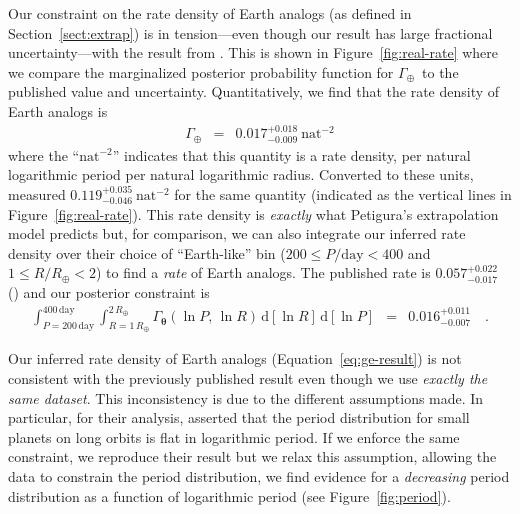 \documentclass[12pt,preprint]{aastex}
\newcommand{\figref}[1]{\ref{fig:#1}}
\newcommand{\Fig}[1]{Figure~\figref{#1}}
\newcommand{\fig}[1]{\Fig{#1}}
\newcommand{\eqalt}[1]{Equation~\ref{eq:#1}}
\newcommand{\eqlabel}[1]{\label{eq:#1}}
\newcommand{\Sect}[1]{Section~\ref{sect:#1}}
\newcommand{\sect}[1]{\Sect{#1}}
\newcommand{\dd}{\ensuremath{\,\mathrm{d}}}
\newcommand{\bvec}[1]{\ensuremath{\boldsymbol{#1}}}
\newcommand{\densityunit}{{\ensuremath{\mathrm{nat}^{-2}}}}
\newcommand{\rate}{\ensuremath{\Gamma}}
\newcommand{\ratepar}{{\ensuremath{\theta}}}
\newcommand{\ratepars}{{\ensuremath{\bvec{\ratepar}}}}
\newcommand{\radius}{\ensuremath{R}}
\newcommand{\period}{\ensuremath{P}}
\newcommand{\gammaearth}{{\ensuremath{\rate_\oplus}}}
\begin{document}
Our constraint on the rate density of Earth analogs (as defined in
\sect{extrap}) is in tension---even though our result has large fractional
uncertainty---with the result from \citet{petigura}.
This is shown in \fig{real-rate} where we compare the marginalized posterior
probability function for \gammaearth\ to the published value and uncertainty.
Quantitatively, we find that the rate density of Earth analogs is
\begin{eqnarray}\eqlabel{ge-result}
\gammaearth &=& 0.017^{+0.018}_{-0.009}~\densityunit
\end{eqnarray}
where the ``\densityunit'' indicates that this quantity is a rate density, per
natural logarithmic period per natural logarithmic radius.
Converted to these units, \citet{petigura} measured
$0.119_{-0.046}^{+0.035}~\densityunit$ for the same quantity (indicated as the
vertical lines in \fig{real-rate}).
This rate density is \emph{exactly} what Petigura's extrapolation model
predicts but, for comparison, we can also integrate our inferred rate density
over their choice of ``Earth-like'' bin ($200 \le \period/\mathrm{day} < 400$
and $1 \le \radius/\radius_\oplus < 2$) to find a \emph{rate} of
Earth analogs.
The published rate is $0.057_{-0.017}^{+0.022}$ (\citealt{petigura}) and our
posterior constraint is
\begin{eqnarray}
\int_{\period=200\,\mathrm{day}}^{400\,\mathrm{day}}
\int_{\radius=1\,\radius_\oplus}^{2\,\radius_\oplus}
\rate_\ratepars (\ln\period,\,\ln\radius)
\dd[\ln\radius]
\dd[\ln\period]
&=&
0.016_{-0.007}^{+0.011}
\quad.
\end{eqnarray}

Our inferred rate density of Earth analogs (\eqalt{ge-result}) is not
consistent with the previously published result even though we use
\emph{exactly the same dataset}.
This inconsistency is due to the different assumptions made.
In particular, for their analysis, \citet{petigura} asserted that the period
distribution for small planets on long orbits is flat in logarithmic period.
If we enforce the same constraint, we reproduce their result but we relax this
assumption, allowing the data to constrain the period distribution, we find
evidence for a \emph{decreasing} period distribution as a function of
logarithmic period (see \fig{period}).
\end{document}
